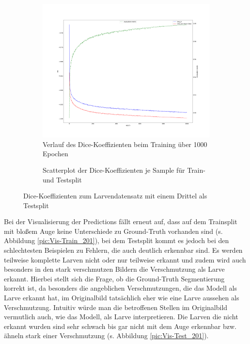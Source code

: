 \begin{figure}[H]
\centering
\begin{minipage}{.6\textwidth}
\begin{subfigure}{\textwidth}
\centering
\includegraphics[width=\textwidth]{Pictures/nnUnet/Praxis/Task201-Larven-drittel-testsplit/progress_201-Larven-drittel-testsplit.png}
\caption{Verlauf des Dice-Koeffizienten beim Training über 1000 Epochen}
\label{pic:Prog_201}
\end{subfigure}
\end{minipage}%
\begin{minipage}{.4\textwidth}
\begin{subfigure}{\textwidth}

\caption{Scatterplot der Dice-Koeffizienten je Sample für Train- und Testsplit}
\label{pic:Dice_201}
\end{subfigure}
\end{minipage}

\caption{Dice-Koeffizienten zum Larvendatensatz mit einem Drittel als Testsplit}
\end{figure}

Bei der Visualisierung der Predictions fällt erneut auf, dass auf dem Trainsplit mit bloßem Auge keine Unterschiede zu Ground-Truth vorhanden sind (s. Abbildung \ref{pic:Vis-Train_201}), bei dem Testsplit kommt es jedoch bei den schlechtesten Beispielen zu Fehlern, die auch deutlich erkennbar sind. Es werden teilweise komplette Larven nicht oder nur teilweise erkannt und zudem wird auch besonders in den stark verschmutzen Bildern die Verschmutzung als Larve erkannt. Hierbei stellt sich die Frage, ob die Ground-Truth Segmentierung korrekt ist, da besonders die angeblichen Verschmutzungen, die das Modell als Larve erkannt hat, im Originalbild tatsächlich eher wie eine Larve aussehen als Verschmutzung. Intuitiv würde man die betroffenen Stellen im Originalbild vermutlich auch, wie das Modell, als Larve interpretieren. Die Larven die nicht erkannt wurden sind sehr schwach bis gar nicht mit dem Auge erkennbar bzw. ähneln stark einer Verschmutzung (s. Abbildung \ref{pic:Vis-Test_201}).

